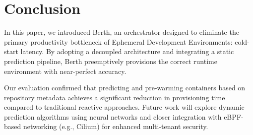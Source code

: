 \section{Conclusion}

In this paper, we introduced Berth, an orchestrator designed to eliminate the primary productivity bottleneck of Ephemeral Development Environments: cold-start latency. By adopting a decoupled architecture and integrating a static prediction pipeline, Berth preemptively provisions the correct runtime environment with near-perfect accuracy. 

Our evaluation confirmed that predicting and pre-warming containers based on repository metadata achieves a significant reduction in provisioning time compared to traditional reactive approaches. Future work will explore dynamic prediction algorithms using neural networks and closer integration with eBPF-based networking (e.g., Cilium) for enhanced multi-tenant security.
